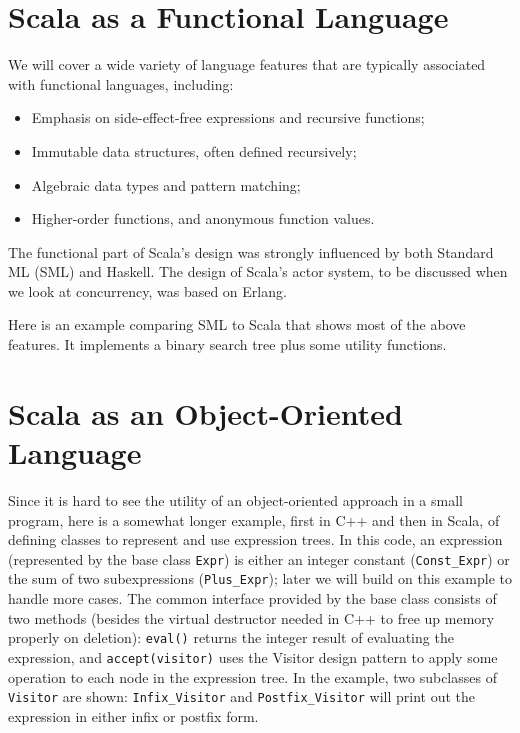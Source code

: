 \documentclass[11pt]{article}
\begin{document}
\section{Scala as a Functional Language}
We will cover a wide variety of language features that are typically
associated with functional languages, including:
\begin{itemize}
\item Emphasis on side-effect-free expressions and recursive functions;
\item Immutable data structures, often defined recursively;
\item Algebraic data types and pattern matching;
\item Higher-order functions, and anonymous function values.
\end{itemize}
The functional part of Scala's design was strongly influenced by
both Standard ML (SML) and Haskell. The design of Scala's actor
system, to be discussed when we look at concurrency, was based on
Erlang.

Here is an example comparing SML to Scala that shows most of the
above features. It implements a binary search tree plus some utility
functions.

\section{Scala as an Object-Oriented Language}
Since it is hard to see the utility of an object-oriented approach
in a small program, here is a somewhat longer example, first in C++
and then in Scala, of defining classes to represent and use expression
trees. In this code, an expression (represented by the base class
\verb|Expr|) is either an integer constant (\verb|Const_Expr|) or
the sum of two subexpressions (\verb|Plus_Expr|); later we will
build on this example to handle more cases. The common interface
provided by the base class consists of two methods (besides the
virtual destructor needed in C++ to free up memory properly on
deletion): \verb|eval()| returns the integer result of evaluating
the expression, and \verb|accept(visitor)| uses the Visitor design
pattern to apply some operation to each node in the expression tree.
In the example, two subclasses of \verb|Visitor| are shown:
\verb|Infix_Visitor| and \verb|Postfix_Visitor| will print out the
expression in either infix or postfix form.
\end{document}
